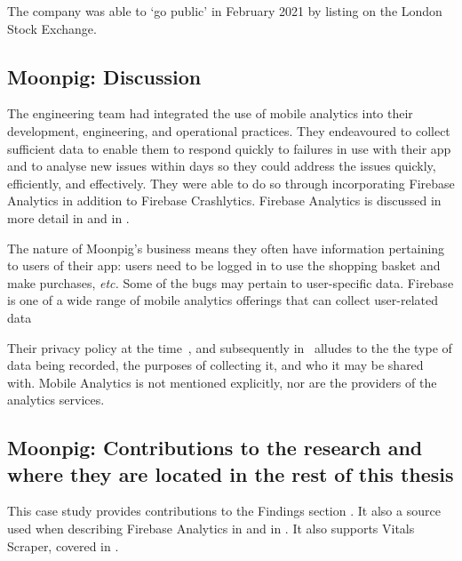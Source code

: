 The company was able to `go public' in February 2021 by listing on the London Stock Exchange.  

\subsection{Moonpig: Discussion}
The engineering team had integrated the use of mobile analytics into their development, engineering, and operational practices. They endeavoured to collect sufficient data to enable them to respond quickly to failures in use with their app and to analyse new issues within days so they could address the issues quickly, efficiently, and effectively. They were able to do so through incorporating Firebase Analytics in addition to Firebase Crashlytics. Firebase Analytics is discussed in more detail in  and in .

The nature of Moonpig's business means they often have information pertaining to users of their app: users need to be logged in to use the shopping basket and make purchases, \emph{etc.} 
Some of the bugs may pertain to user-specific data. Firebase is one of a wide range of mobile analytics offerings that can collect user-related data


Their privacy policy at the time~\citep{moonpig_privacy_policy_2019_feb_21}, and subsequently in~\citep{moonpig_privacy_policy_2021_aug_12} alludes to the the type of data being recorded, the purposes of collecting it, and who it may be shared with. Mobile Analytics is not mentioned explicitly, nor are the providers of the analytics services.

\subsection{Moonpig: Contributions to the research and where they are located in the rest of this thesis}
This case study provides contributions to the Findings section . It also a source used when describing Firebase Analytics in  and in . It also supports Vitals Scraper, covered in . 
